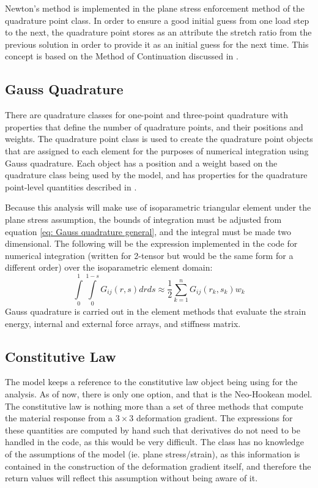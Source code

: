 \documentclass[]{spie}  %
\begin{document}
Newton's method is implemented in the plane stress enforcement method of the quadrature point class. In order to ensure a good initial guess from one load step to the next, the quadrature point stores as an attribute the stretch ratio from the previous solution in order to provide it as an initial guess for the next time. This concept is based on the Method of Continuation discussed in \textit{}. 

\subsection{Gauss Quadrature}
There are quadrature classes for one-point and three-point quadrature with properties that define the number of quadrature points, and their positions and weights. The quadrature point class is used to create the quadrature point objects that are assigned to each element for the purposes of numerical integration using Gauss quadrature. Each object has a position and a weight based on the quadrature class being used by the model, and has properties for the quadrature point-level quantities described in \textit{}. 

Because this analysis will make use of isoparametric triangular element under the plane stress assumption, the bounds of integration must be adjusted from equation \ref{eq: Gauss quadrature general}, and the integral must be made two dimensional. The following will be the expression implemented in the code for numerical integration (written for 2-tensor but would be the same form for a different order) over the isoparametric element domain:
\begin{equation}
\label{eq: Gauss quadrature}
\int\limits_{0}^{1} \int\limits_{0}^{1-s} G_{ij}(r,s)dr ds \approx \frac{1}{2} \sum\limits_{k=1}^{n} G_{ij}(r_k,s_k) w_k
\end{equation}
Gauss quadrature is carried out in the element methods that evaluate the strain energy, internal and external force arrays, and stiffness matrix.

\subsection{Constitutive Law}
The model keeps a reference to the constitutive law object being using for the analysis. As of now, there is only one option, and that is the Neo-Hookean model. The constitutive law is nothing more than a set of three methods that compute the material response from a $3 \times 3$ deformation gradient. The expressions for these quantities are computed by hand such that derivatives do not need to be handled in the code, as this would be very difficult. The class has no knowledge of the assumptions of the model (ie. plane stress/strain), as this information is contained in the construction of the deformation gradient itself, and therefore the return values will reflect this assumption without being aware of it. 
\end{document}

